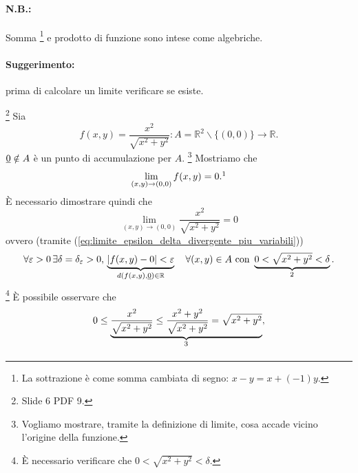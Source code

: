 \paragraph{N.B.:} Somma \footnote{La sottrazione è come somma cambiata di segno: $x-y=x+(-1) y$.} e prodotto di funzione sono intese come algebriche.

\paragraph{Suggerimento:} prima di calcolare un limite verificare se esiste.

\begin{example}\footnote{Slide 6 PDF 9.}
    Sia
    \begin{equation*}
        f(x,y)=\frac{x^2}{\sqrt{x^2+y^2}}\colon A=\mathbb R^2\backslash\{(0,0)\}\rightarrow\mathbb R.
    \end{equation*}
    $\uline 0\notin A$ è un punto di accumulazione per $A$.
    \footnote{Vogliamo mostrare, tramite la definizione di limite, cosa accade vicino l'origine della funzione.} Mostriamo che
    \begin{equation*}
        \lim\limits_{(x,y)\rightarrow(0,0)}f(x,y)=0.\footnotemark
    \end{equation*}
    È necessario dimostrare quindi che
    \begin{equation*}
        \lim\limits_{(x,y)\rightarrow(0,0)}\frac{x^2}{\sqrt{x^2+y^2}}=0
    \end{equation*}
    ovvero (tramite (\ref{eq:limite_epsilon_delta_divergente_piu_variabili}))
    \begin{equation*}
        \forall\varepsilon>0\,\exists\delta=\delta_\varepsilon>0,\, \underbrace{|f(x,y)-0|<\varepsilon}_{d(f(x,y),\uline 0)\in\mathbb R}\quad \forall(x,y)\in A \text{ con } \underbrace{0<\sqrt{x^2+y^2}<\delta}_{\footnotemark}.
    \end{equation*}
    \footnote{È necessario verificare che $0<\sqrt{x^2+y^2}<\delta$.} È possibile osservare che
    \begin{equation*}
        0\leq\underbrace{\frac{x^2}{\sqrt{x^2+y^2}}\leq\frac{x^2+y^2}{\sqrt{x^2+y^2}}=\sqrt{x^2+y^2}}_{\footnotemark},

\end{equation*}
\end{example}

